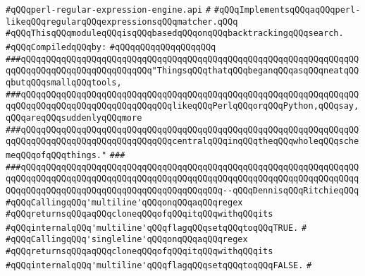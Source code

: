 \label{src/lib/regex/backend/perl-regex-engine.api}
\verb|#qQQqperl-regular-expression-engine.api|\newline
\verb|#|\newline
\verb|#qQQqImplementsqQQqaqQQqperl-likeqQQqregularqQQqexpressionsqQQqmatcher.qQQq|\newline
\verb|#qQQqThisqQQqmoduleqQQqisqQQqbasedqQQqonqQQqbacktrackingqQQqsearch.|\newline
\newline
\verb|#qQQqCompiledqQQqby:|\newline
\verb|#qQQqqQQqqQQqqQQqqQQq|\newline
\newline
\verb|###qQQqqQQqqQQqqQQqqQQqqQQqqQQqqQQqqQQqqQQqqQQqqQQqqQQqqQQqqQQqqQQqqQQqqQQqqQQqqQQqqQQqqQQqqQQqqQQq"ThingsqQQqthatqQQqbeganqQQqasqQQqneatqQQqbutqQQqsmallqQQqtools,|\newline
\verb|###qQQqqQQqqQQqqQQqqQQqqQQqqQQqqQQqqQQqqQQqqQQqqQQqqQQqqQQqqQQqqQQqqQQqqQQqqQQqqQQqqQQqqQQqqQQqqQQqqQQqlikeqQQqPerlqQQqorqQQqPython,qQQqsay,qQQqareqQQqsuddenlyqQQqmore|\newline
\verb|###qQQqqQQqqQQqqQQqqQQqqQQqqQQqqQQqqQQqqQQqqQQqqQQqqQQqqQQqqQQqqQQqqQQqqQQqqQQqqQQqqQQqqQQqqQQqqQQqqQQqcentralqQQqinqQQqtheqQQqwholeqQQqschemeqQQqofqQQqthings."|\newline
\verb|###|\newline
\verb|###qQQqqQQqqQQqqQQqqQQqqQQqqQQqqQQqqQQqqQQqqQQqqQQqqQQqqQQqqQQqqQQqqQQqqQQqqQQqqQQqqQQqqQQqqQQqqQQqqQQqqQQqqQQqqQQqqQQqqQQqqQQqqQQqqQQqqQQqqQQqqQQqqQQqqQQqqQQqqQQqqQQqqQQqqQQqqQQqqQQq--qQQqDennisqQQqRitchieqQQq|\newline
\newline
\newline
\verb|#qQQqCallingqQQq'multiline'qQQqonqQQqaqQQqregex|\newline
\verb|#qQQqreturnsqQQqaqQQqcloneqQQqofqQQqitqQQqwithqQQqits|\newline
\verb|#qQQqinternalqQQq'multiline'qQQqflagqQQqsetqQQqtoqQQqTRUE.|\newline
\verb|#|\newline
\verb|#qQQqCallingqQQq'singleline'qQQqonqQQqaqQQqregex|\newline
\verb|#qQQqreturnsqQQqaqQQqcloneqQQqofqQQqitqQQqwithqQQqits|\newline
\verb|#qQQqinternalqQQq'multiline'qQQqflagqQQqsetqQQqtoqQQqFALSE.|\newline
\verb|#|\newline
